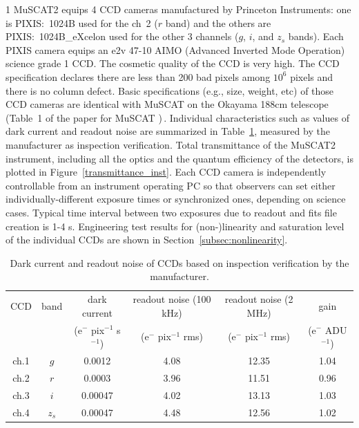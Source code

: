 \documentclass[a4paper,12pt]{spieman}  %
\begin{document}
\begin{spacing}{1}
MuSCAT2 equips 4 CCD cameras manufactured by Princeton Instruments:
one is PIXIS:~1024B used for the ch~2 ($r$ band) and
the others are PIXIS:~1024B\_eXcelon used for the other 3 channels
($g$, $i$, and $z_{s}$ bands).
Each PIXIS camera equips an e2v 47-10 AIMO (Advanced Inverted Mode Operation) science grade 1 CCD.
The cosmetic quality of the CCD is very high.
The CCD specification declares there are less than 200 bad pixels among
$10^6$ pixels and there is no column defect.
Basic specifications (e.g., size, weight, etc) of those CCD cameras are identical with MuSCAT on
the Okayama 188cm telescope (Table~1 of the paper for MuSCAT \cite{2015JATIS...1d5001N})\,\!.
Individual characteristics such as values of dark current and readout noise are summarized in
Table~\ref{CCDsummary}, measured by the manufacturer as inspection verification.
Total transmittance of the MuSCAT2 instrument, including all the optics and the quantum efficiency
of the detectors, is plotted in Figure~\ref{transmittance_inst}.
Each CCD camera is independently controllable from an instrument operating PC so that
observers can set either individually-different exposure times or synchronized ones,
depending on science cases.
Typical time interval between two exposures due to readout and fits file creation is 1-4 s.
Engineering test results for (non-)linearity and saturation level of the individual CCDs are shown
in Section~\ref{subsec:nonlinearity}.

\begin{table}
\caption{
\label{CCDsummary}
Dark current and readout noise of CCDs based on inspection verification by the manufacturer.
}
\begin{center}
\begin{tabular}{c|ccccc}
\hline \hline
CCD & band & dark current & readout noise (100 kHz) & readout noise (2 MHz) & gain \\
& & (e$^{-}$ pix$^{-1}$ s$^{-1}$) & (e$^{-}$ pix$^{-1}$ rms) & (e$^{-}$  pix$^{-1}$ rms) & (e$^{-}$ ADU$^{-1}$) \\
\hline
ch.1 & $g$  & 0.0012  & 4.08 & 12.35 & 1.04\\
ch.2 & $r$  & 0.0003  & 3.96 & 11.51 & 0.96 \\
ch.3 & $i$  & 0.00047 & 4.02 & 13.13 & 1.03 \\
ch.4 & $z_s$ &  0.00047 & 4.48 & 12.56 & 1.02 \\
\hline
\end{tabular}
\end{center}
\end{table}


\end{spacing}
\end{document}
